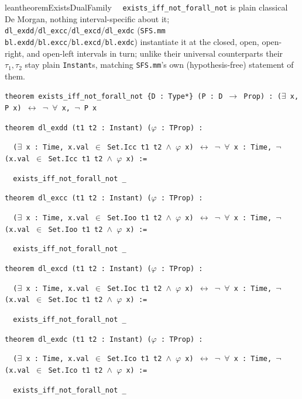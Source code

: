\begin{restatable}{leantheorem}{ExistsDualFamily}~~ \texttt{exists\_iff\_not\_forall\_not} is plain classical De Morgan, nothing interval-specific about it; \texttt{dl\_exdd}/\texttt{dl\_excc}/\texttt{dl\_excd}/\texttt{dl\_exdc} (\texttt{SFS.mm} \texttt{bl.exdd}/\texttt{bl.excc}/\texttt{bl.excd}/\texttt{bl.exdc}) instantiate it at the closed, open, open-right, and open-left intervals in turn; unlike their universal counterparts their $\tau_1,\tau_2$ stay plain \texttt{Instant}s, matching \texttt{SFS.mm}'s own (hypothesis-free) statement of them.

\texttt{\textcolor{leancolor}{theorem} \textcolor{leanyellow}{exists\_iff\_not\_forall\_not} \{D : Type*\} (P : D $\to$ Prop) : ($\exists$ x, P x) $\leftrightarrow$ $\neg$ $\forall$ x, $\neg$ P x}

\texttt{\textcolor{leancolor}{theorem} \textcolor{leanyellow}{dl\_exdd} (t1 t2 : Instant) ($\varphi$ : TProp) :}

\texttt{~~($\exists$ x : Time, x.val $\in$ Set.Icc t1 t2 $\wedge$ $\varphi$ x) $\leftrightarrow$ $\neg$ $\forall$ x : Time, $\neg$ (x.val $\in$ Set.Icc t1 t2 $\wedge$ $\varphi$ x) :=}

\texttt{~~exists\_iff\_not\_forall\_not \_}

\texttt{\textcolor{leancolor}{theorem} \textcolor{leanyellow}{dl\_excc} (t1 t2 : Instant) ($\varphi$ : TProp) :}

\texttt{~~($\exists$ x : Time, x.val $\in$ Set.Ioo t1 t2 $\wedge$ $\varphi$ x) $\leftrightarrow$ $\neg$ $\forall$ x : Time, $\neg$ (x.val $\in$ Set.Ioo t1 t2 $\wedge$ $\varphi$ x) :=}

\texttt{~~exists\_iff\_not\_forall\_not \_}

\texttt{\textcolor{leancolor}{theorem} \textcolor{leanyellow}{dl\_excd} (t1 t2 : Instant) ($\varphi$ : TProp) :}

\texttt{~~($\exists$ x : Time, x.val $\in$ Set.Ioc t1 t2 $\wedge$ $\varphi$ x) $\leftrightarrow$ $\neg$ $\forall$ x : Time, $\neg$ (x.val $\in$ Set.Ioc t1 t2 $\wedge$ $\varphi$ x) :=}

\texttt{~~exists\_iff\_not\_forall\_not \_}

\texttt{\textcolor{leancolor}{theorem} \textcolor{leanyellow}{dl\_exdc} (t1 t2 : Instant) ($\varphi$ : TProp) :}

\texttt{~~($\exists$ x : Time, x.val $\in$ Set.Ico t1 t2 $\wedge$ $\varphi$ x) $\leftrightarrow$ $\neg$ $\forall$ x : Time, $\neg$ (x.val $\in$ Set.Ico t1 t2 $\wedge$ $\varphi$ x) :=}

\texttt{~~exists\_iff\_not\_forall\_not \_}
\label{exists_iff_not_forall_not}
\label{dl_exdd}
\label{dl_excc}
\label{dl_excd}
\label{dl_exdc}
\end{restatable}

